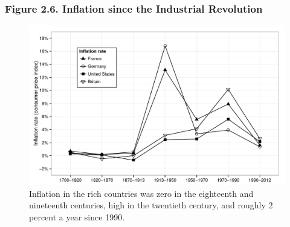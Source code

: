 \documentclass[t]{beamer}\usepackage[]{graphicx}\usepackage[]{color}
\newenvironment{knitrout}{}{} %
\begin{document}
\begin{frame}[label=Figure_2_6,fragile]
\frametitle{Figure 2.6. Inflation since the Industrial Revolution}
\begin{figure}[t]
\begin{minipage}[b]{\textwidth}
\centering
\begin{knitrout}\footnotesize
{}\color{fgcolor}

{\centering \includegraphics[width=1\linewidth]{figures/bw/Figure_2_6} 

}



\end{knitrout}
\caption{Inflation in the rich countries was zero in the eighteenth and nineteenth centuries, high in the twentieth century, and roughly 2 percent a year since 1990.}
\end{minipage}
\end{figure}
\end{frame}
\end{document}
